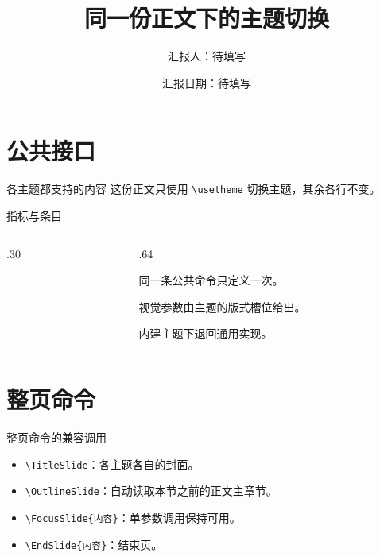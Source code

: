 \documentclass[aspectratio=169]{ctexbeamer}
\title[同一份正文]{同一份正文下的主题切换}
\author{汇报人：待填写}
\institute{哈尔滨工业大学}
\date{汇报日期：待填写}
\begin{document}
\TitleSlide
\OutlineSlide

\section{公共接口}

\begin{frame}{各主题都支持的内容}
  这份正文只使用 \texttt{\textbackslash usetheme} 切换主题，其余各行不变。

\end{frame}

\begin{frame}{指标与条目}
  \begin{columns}[T,onlytextwidth]
    \begin{column}{.30\textwidth}
    \end{column}
    \begin{column}{.64\textwidth}
      \begin{denseitems}
        \item 同一条公共命令只定义一次。
        \item 视觉参数由主题的版式槽位给出。
        \item 内建主题下退回通用实现。
      \end{denseitems}
    \end{column}
  \end{columns}
\end{frame}

\section{整页命令}

\begin{frame}{整页命令的兼容调用}
  \begin{itemize}
    \item \texttt{\textbackslash TitleSlide}：各主题各自的封面。
    \item \texttt{\textbackslash OutlineSlide}：自动读取本节之前的正文主章节。
    \item \texttt{\textbackslash FocusSlide\{内容\}}：单参数调用保持可用。
    \item \texttt{\textbackslash EndSlide\{内容\}}：结束页。
  \end{itemize}
\end{frame}


\end{document}
